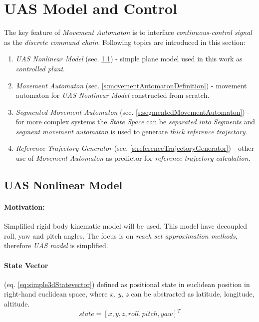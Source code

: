 \cleardoublepage
\section{UAS Model and Control}\label{s:modelMAImplementation}

\noindent The key feature of \emph{Movement Automaton} is to interface \emph{continuous-control signal} as the \emph{discrete command chain}. Following topics are introduced in this section:

\begin{enumerate}
    \item \emph{UAS Nonlinear Model} (sec. \ref{s:UASNonlinearModel}) - simple plane model used in this work as \emph{controlled plant}.
    
    \item \emph{Movement Automaton} (sec. \ref{s:movementAutomatonDefinition}) - movement automaton for \emph{UAS Nonlinear Model} constructed from scratch.
    
    \item \emph{Segmented Movement Automaton} (sec. \ref{s:segmentedMovementAutomaton}) - for more complex systems the \emph{State Space} can be \emph{separated into Segments} and \emph{segment movement automaton} is used to generate \emph{thick reference trajectory}.
    
    \item \emph{Reference Trajectory Generator} (sec. \ref{s:referenceTrajectoryGenerator}) - other use of \emph{Movement Automaton} as predictor for \emph{reference trajectory calculation}.
\end{enumerate}


\subsection{UAS Nonlinear Model}\label{s:UASNonlinearModel}
\paragraph{Motivation:} Simplified rigid body kinematic model will be used. This model have decoupled roll, yaw and pitch angles. The focus is on \emph{reach set approximation methods}, therefore \emph{UAS model} is simplified.

\paragraph{State Vector} (eq. \ref{eq:simple3dStatevector}) defined as positional state in euclidean position in right-hand euclidean space, where \emph{x, y, z} can be abstracted as latitude, longitude, altitude.
\begin{equation}\label{eq:simple3dStatevector}
    state = \left [ x,y,z, roll, pitch, yaw \right]^T
\end{equation}


